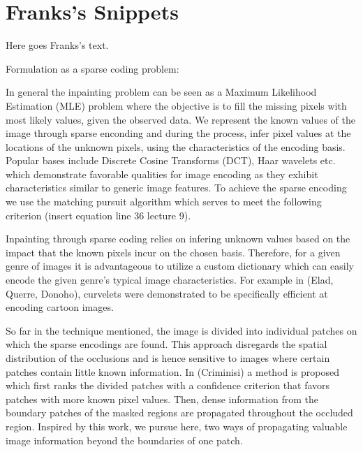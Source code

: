 \section*{Franks's Snippets}
Here goes Franks's text.

Formulation as a sparse coding problem:

In general the inpainting problem can be seen as a Maximum Likelihood Estimation (MLE) problem where the objective is to fill the missing pixels with most likely values, given the observed data. We represent the known values of the image through sparse enconding and during the process, infer pixel values at the locations of the unknown pixels, using the characteristics of the encoding basis. Popular bases include Discrete Cosine Transforms (DCT), Haar wavelets etc. which demonstrate favorable qualities for image encoding as they exhibit characteristics similar to generic image features. To achieve the sparse encoding we use the matching pursuit algorithm which serves to meet the following criterion (insert equation line 36 lecture 9).

Inpainting through sparse coding relies on infering unknown values based on the impact that the known pixels incur on the chosen basis. Therefore, for a given genre of images it is advantageous to utilize a custom dictionary which can easily encode the given genre's typical image characteristics. For example  in (Elad, Querre, Donoho), curvelets were demonstrated to be specifically efficient at encoding cartoon images. 

So far in the technique mentioned, the image is divided into individual patches on which the sparse encodings are found. This approach disregards the spatial distribution of the occlusions and is hence sensitive to images where certain patches contain little known information. In (Criminisi) a method is proposed which first ranks the divided patches with a confidence criterion that favors patches with more known pixel values. Then, dense information from the boundary patches of the masked regions are propagated throughout the occluded region. Inspired by this work, we pursue here, two ways of propagating valuable image information beyond the boundaries of one patch.